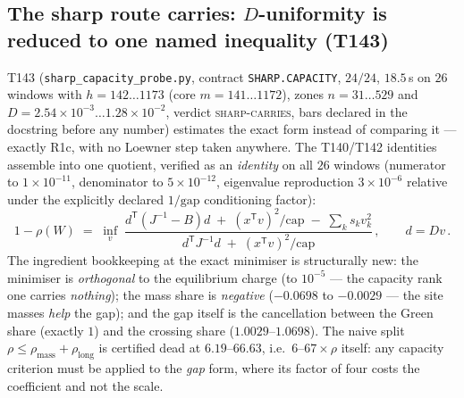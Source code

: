 \documentclass[11pt,a4paper]{article}
\begin{document}
\subsection{The sharp route carries: $D$-uniformity is reduced to one named inequality (T143)}
T143 (\texttt{sharp\_capacity\_probe.py}, contract \texttt{SHARP.CAPACITY}, $24/24$, $18.5$\,s on
$26$ windows with $h=142\ldots1173$ (core $m=141\ldots1172$), zones $n=31\ldots529$ and
$D=2.54\times10^{-3}\ldots1.28\times10^{-2}$, verdict \textsc{sharp-carries}, bars declared in
the docstring before any number) estimates the exact form instead of comparing it --- exactly
R1c, with no Loewner step taken anywhere. The T140/T142 identities assemble into one quotient,
verified as an \emph{identity} on all $26$ windows (numerator to $1\times10^{-11}$, denominator
to $5\times10^{-12}$, eigenvalue reproduction $3\times10^{-6}$ relative under the explicitly
declared $1/\mathrm{gap}$ conditioning factor):
\[
1-\rho(W) \;=\; \inf_v\;
\frac{d^{\mathsf T}\!\left(J^{-1}-B\right)d \;+\; (x^{\mathsf T}v)^2/\mathrm{cap}
      \;-\; \sum_k s_k v_k^2}
     {d^{\mathsf T}J^{-1}d \;+\; (x^{\mathsf T}v)^2/\mathrm{cap}}\,,
\qquad d = Dv\,.
\]
The ingredient bookkeeping at the exact minimiser is structurally new: the minimiser is
\emph{orthogonal} to the equilibrium charge (to $10^{-5}$ --- the capacity rank one carries
\emph{nothing}); the mass share is \emph{negative} ($-0.0698$ to $-0.0029$ --- the site masses
\emph{help} the gap); and the gap itself is the cancellation between the Green share (exactly
$1$) and the crossing share ($1.0029$--$1.0698$). The naive split
$\rho\le\rho_{\mathrm{mass}}+\rho_{\mathrm{long}}$ is certified dead at $6.19$--$66.63$, i.e.\
$6$--$67\times\rho$ itself: any capacity criterion must be applied to the \emph{gap} form, where
its factor of four costs the coefficient and not the scale.
\end{document}
